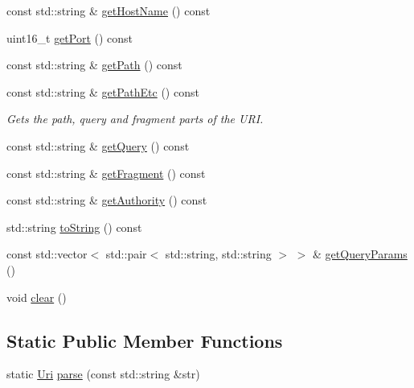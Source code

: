 \begin{DoxyCompactItemize}
\item 
const std\+::string \& \hyperlink{classnetwork_1_1Uri_a3d73311f4e6ff76f0b87854e8b2f7113}{get\+Host\+Name} () const
\item 
uint16\+\_\+t \hyperlink{classnetwork_1_1Uri_ad6bf232516f3a22e0b9641b6a0fd2670}{get\+Port} () const
\item 
const std\+::string \& \hyperlink{classnetwork_1_1Uri_a3c3375f83145b6ee23a0e798f9c9b156}{get\+Path} () const
\item 
\mbox{\label{classnetwork_1_1Uri_ab202e0cb75636c0ea6943d358b531983}} 
const std\+::string \& \hyperlink{classnetwork_1_1Uri_ab202e0cb75636c0ea6943d358b531983}{get\+Path\+Etc} () const
\begin{DoxyCompactList}\small\item\em Gets the path, query and fragment parts of the U\+RI. \end{DoxyCompactList}\item 
const std\+::string \& \hyperlink{classnetwork_1_1Uri_a846ce329ccfca7a0d8d87057bb6cf1eb}{get\+Query} () const
\item 
const std\+::string \& \hyperlink{classnetwork_1_1Uri_a4d84c0af6027ee822b5b1d1473d152c7}{get\+Fragment} () const
\item 
const std\+::string \& \hyperlink{classnetwork_1_1Uri_a1e1dc24899d904d933305b664efff40b}{get\+Authority} () const
\item 
std\+::string \hyperlink{classnetwork_1_1Uri_a2476a7d215d0c34a21cd7eba55514e8e}{to\+String} () const
\item 
const std\+::vector$<$ std\+::pair$<$ std\+::string, std\+::string $>$ $>$ \& \hyperlink{classnetwork_1_1Uri_aa546a407e803754b573bbe5c13e28d77}{get\+Query\+Params} ()
\item 
void \hyperlink{classnetwork_1_1Uri_a533aa1434d65a153f23a69da5eb2c8d2}{clear} ()
\end{DoxyCompactItemize}
\subsection*{Static Public Member Functions}
\begin{DoxyCompactItemize}
\item 
static \hyperlink{classnetwork_1_1Uri}{Uri} \hyperlink{classnetwork_1_1Uri_aa526496d9792b38f2ef403e9e307c1b3}{parse} (const std\+::string \&str)
\end{DoxyCompactItemize}


